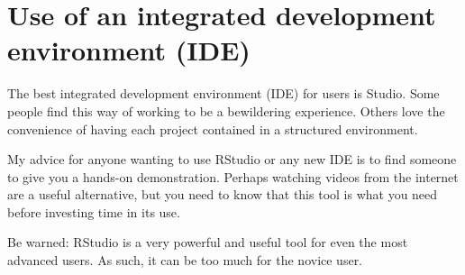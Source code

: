 \section{Use of an integrated development environment (IDE)} 

The best integrated development environment (IDE) for \R{} users is \R{} Studio. Some people find this way of working to be a bewildering experience. Others love the convenience of having each project contained in a structured environment.

My advice for anyone wanting to use RStudio or any new IDE is to find someone to give you a hands-on demonstration. Perhaps watching videos from the internet are a useful alternative, but you need to know that this tool is what you need before investing time in its use.

Be warned: RStudio is a very powerful and useful tool for even the most advanced \R{} users. As such, it can be too much for the novice \R{} user.



